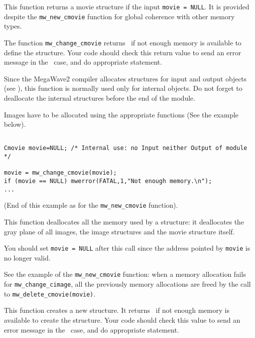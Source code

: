\Description
This function returns a movie structure if the input \verb+movie = NULL+.
It is provided despite the \verb+mw_new_cmovie+ function for
global coherence with other memory types.

The function \verb+mw_change_cmovie+ returns \Null\ if not enough memory is available to define the structure. Your code should check this return value to 
send an error message in the \Null\ case, and do appropriate statement.

Since the MegaWave2 compiler allocates structures for input and output 
objects (see \volI), this function is normally used only for internal objects.
Do not forget to deallocate the internal structures before the end
of the module.

Images have to be allocated using the appropriate functions (See the example
below).

\Next
\Example
\begin{verbatim}

Cmovie movie=NULL; /* Internal use: no Input neither Output of module */

movie = mw_change_cmovie(movie);
if (movie == NULL) mwerror(FATAL,1,"Not enough memory.\n");
...
\end{verbatim}
(End of this example as for the \verb+mw_new_cmovie+ function).
\newpage %


\Description
This function deallocates all the memory used by a \cmovie structure:
it deallocates the gray plane of all images, the image structures and
the movie structure itself.

You should set \verb+movie = NULL+ after this call since the address pointed
by \verb+movie+ is no longer valid.

\Next
\Example
See the example of the \verb+mw_new_cmovie+ function: when a memory allocation
fails for \verb+mw_change_cimage+, all the previously memory allocations are
freed by the call to \verb+mw_delete_cmovie(movie)+.

\newpage %


\Description
This function creates a new \cmovie structure.
It returns \Null\ if not enough memory is available to create the structure.
Your code should check this value to send an
error message in the \Null\ case, and do appropriate statement.

